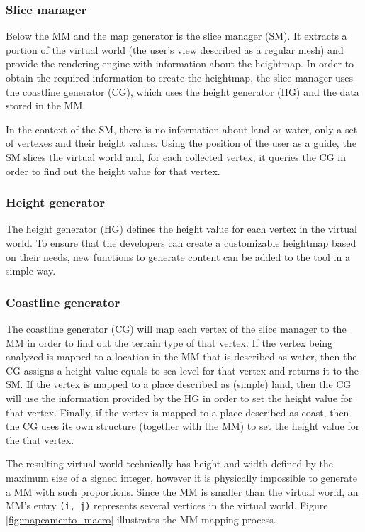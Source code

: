 \documentclass[10pt, conference, compsocconf]{IEEEtran}
\begin{document}
\subsubsection{Slice manager}

Below the MM and the map generator is the slice manager (SM). It extracts a portion of the virtual world (the user's view described as a regular mesh) and provide the rendering engine with information about the heightmap. In order to obtain the required information to create the heightmap, the slice manager uses the coastline generator (CG), which uses the height generator (HG) and the data stored in the MM.

In the context of the SM, there is no information about land or water, only a set of vertexes and their height values. Using the position of the user as a guide, the SM slices the virtual world and, for each collected vertex, it queries the CG in order to find out the height value for that vertex.

\subsubsection{Height generator}

The height generator (HG) defines the height value for each vertex in the virtual world. To ensure that the developers can create a customizable heightmap based on their needs, new functions to generate content can be added to the tool in a simple way.

\subsubsection{Coastline generator}

The coastline generator (CG) will map each vertex of the slice manager to the MM in order to find out the terrain type of that vertex. If the vertex being analyzed is mapped to a location in the MM that is described as water, then the CG assigns a height value equals to sea level for that vertex and returns it to the SM. If the vertex is mapped to a place described as (simple) land, then the CG will use the information provided by the HG in order to set the height value for that vertex. Finally, if the vertex is mapped to a place described as coast, then the CG uses its own structure (together with the MM) to set the height value for the that vertex.

The resulting virtual world technically has height and width defined by the maximum size of a signed integer, however it is physically impossible to generate a MM with such proportions. Since the MM is smaller than the virtual world, an MM's entry {\tt (i, j)} represents several vertices in the virtual world. Figure \ref{fig:mapeamento_macro} illustrates the MM mapping process.
\end{document}
